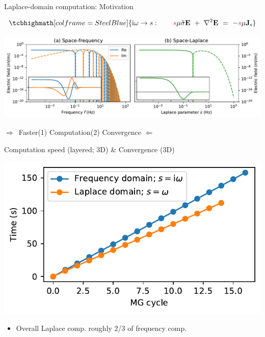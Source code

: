 \documentclass[xcolor=svgnames, usepdftitle=false, aspectratio=169]{beamer}
\newcommand{\bdra}{\ensuremath{\boldsymbol \Rightarrow }~}
\newcommand{\bdla}{\ensuremath{\boldsymbol \Leftarrow }~}
\newcommand{\mr}[1]{\mathrm{#1}}
\begin{document}
\begin{frame}  %
  {Laplace-domain computation: Motivation}
  \centering
  \vspace{-.5cm}

  $$
  \tcbhighmath[colframe=SteelBlue]{
    \mr{i}\omega \rightarrow s:
    \qquad
    \textcolor{red}{s} \mu \tilde{\sigma} \mathbf{E} \ +\
    \nabla^2 \mathbf{E} \ =\ -\textcolor{red}{s} \mu \mathbf{J}_\mathrm{s}
  }
  $$

  \includegraphics[width=\textwidth]{motivationcomparison}

  \raggedright

  \alert{
    \qquad \bdra \quad  Faster\quad (1) Computation\quad (2) Convergence \quad
    \bdla\\}
  \vspace{.5cm}

\end{frame}

\begin{frame}
  {Computation speed (layered; 3D) \& Convergence (3D)}
  \centering

  \includegraphics[width=.6\linewidth]{xf-vs-xs}%

  \begin{itemize}
    \item Overall Laplace comp. roughly 2/3 of frequency comp.
  \end{itemize}
\end{frame}
\end{document}

